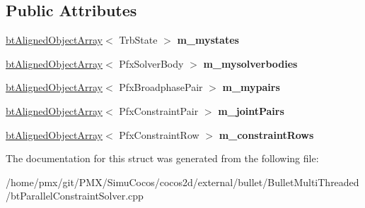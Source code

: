 \subsection*{Public Attributes}
\begin{DoxyCompactItemize}
\item 
\mbox{\label{structbtParallelSolverMemoryCache_a7262d65e67cce8c2c9e703f67fbb0e37}} 
\hyperlink{classbtAlignedObjectArray}{bt\+Aligned\+Object\+Array}$<$ Trb\+State $>$ {\bfseries m\+\_\+mystates}
\item 
\mbox{\label{structbtParallelSolverMemoryCache_af19ee1eba37ebf1458b90fd9f3deff09}} 
\hyperlink{classbtAlignedObjectArray}{bt\+Aligned\+Object\+Array}$<$ Pfx\+Solver\+Body $>$ {\bfseries m\+\_\+mysolverbodies}
\item 
\mbox{\label{structbtParallelSolverMemoryCache_a2685ed32fc69a74baa3d35820ea508c2}} 
\hyperlink{classbtAlignedObjectArray}{bt\+Aligned\+Object\+Array}$<$ Pfx\+Broadphase\+Pair $>$ {\bfseries m\+\_\+mypairs}
\item 
\mbox{\label{structbtParallelSolverMemoryCache_a250f57f0f5f3e09a374f54aef3483a00}} 
\hyperlink{classbtAlignedObjectArray}{bt\+Aligned\+Object\+Array}$<$ Pfx\+Constraint\+Pair $>$ {\bfseries m\+\_\+joint\+Pairs}
\item 
\mbox{\label{structbtParallelSolverMemoryCache_a92c67b698d207c731fbb7e03b433da12}} 
\hyperlink{classbtAlignedObjectArray}{bt\+Aligned\+Object\+Array}$<$ Pfx\+Constraint\+Row $>$ {\bfseries m\+\_\+constraint\+Rows}
\end{DoxyCompactItemize}


The documentation for this struct was generated from the following file\+:\begin{DoxyCompactItemize}
\item 
/home/pmx/git/\+P\+M\+X/\+Simu\+Cocos/cocos2d/external/bullet/\+Bullet\+Multi\+Threaded/bt\+Parallel\+Constraint\+Solver.\+cpp\end{DoxyCompactItemize}
